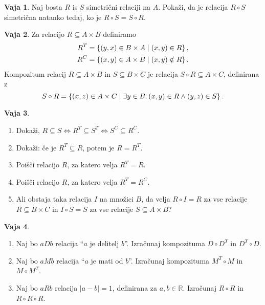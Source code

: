 \documentclass{article}
\newcommand{\some}[1]{\exists #1 .\,}
\newcommand{\RR}{\mathbb{R}}
\theoremstyle{definition}
\newtheorem{vaja}{Vaja}
\begin{document}
\begin{vaja}
Naj bosta $R$ is $S$ simetrični relaciji na $A$. Pokaži, da je relacija $R \circ S$ simetrična natanko tedaj, ko je $R \circ S = S \circ R$.
\end{vaja}



\begin{vaja}
Za relacijo $R \subseteq A \times B$ definiramo
%
\begin{align*}
  R^T &= \set{(y,x) \in B \times A}{(x,y) \in R},\\
  R^C &= \set{(x,y) \in A \times B}{(x,y) \notin R}.
\end{align*}
%
Kompozitum relacij $R \subseteq A \times B$ in $S \subseteq B \times
C$ je relacija $S \circ R \subseteq A \times C$, definirana z
%
\begin{equation*}
  S \circ R = \set{(x,z) \in A \times C}{\some{y \in B}{(x,y) \in R \land (y,z) \in S}}.
\end{equation*}
\end{vaja}

\begin{vaja}
\begin{enumerate}
  \item Dokaži, $R \subseteq S \iff R^T \subseteq
  S^T \iff S^C \subseteq R^C$.

  \item Dokaži: če je $R^T \subseteq R$, potem je $R = R^T$.

  \item Poišči relacijo $R$, za katero velja $R^T = R$.

  \item Poišči relacijo $R$, za katero velja $R^T = R^C$.


  \item Ali obstaja taka relacija $I$ na množici $B$, da velja $R
  \circ I = R$ za vse relacije $R \subseteq B \times C$ in $I \circ S
  = S$ za vse relacije $S \subseteq A \times B$?
\end{enumerate}
\end{vaja}

\begin{vaja}
\begin{enumerate}
  \item Naj bo $a D b$ relacija ``$a$ je delitelj $b$''. Izračunaj
  kompozituma $D \circ D^T$ in $D^T \circ D$.

  \item Naj bo $a M b$ relacija ``$a$ je mati od $b$''. Izračunaj
  kompozituma $M^T \circ M$ in $M \circ M^T$.

  \item Naj bo $a R b$ relacija $|a - b| = 1$, definirana za $a, b
  \in \RR$. Izračunaj $R \circ R$ in $R \circ R \circ R$.
\end{enumerate}
\end{vaja}
\end{document}
